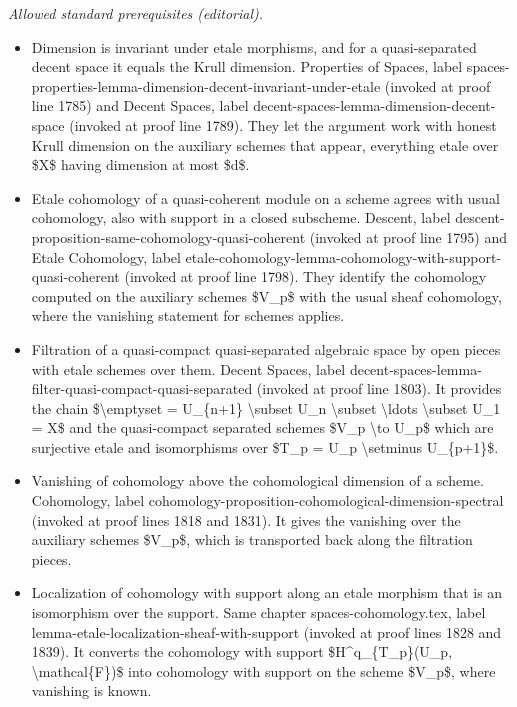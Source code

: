 \documentclass[10pt,a4paper]{amsart}
\theoremstyle{plain}
\theoremstyle{definition}
\theoremstyle{remark}
\numberwithin{equation}{subsection}
\begin{document}
\noindent\textit{Allowed standard prerequisites (editorial).}\begin{itemize}
\item Dimension is invariant under etale morphisms, and for a quasi-separated decent space it equals the Krull dimension. Properties of Spaces, label spaces-properties-lemma-dimension-decent-invariant-under-etale (invoked at proof line 1785) and Decent Spaces, label decent-spaces-lemma-dimension-decent-space (invoked at proof line 1789). They let the argument work with honest Krull dimension on the auxiliary schemes that appear, everything etale over \$X\$ having dimension at most \$d\$.
\item Etale cohomology of a quasi-coherent module on a scheme agrees with usual cohomology, also with support in a closed subscheme. Descent, label descent-proposition-same-cohomology-quasi-coherent (invoked at proof line 1795) and Etale Cohomology, label etale-cohomology-lemma-cohomology-with-support-quasi-coherent (invoked at proof line 1798). They identify the cohomology computed on the auxiliary schemes \$V\_p\$ with the usual sheaf cohomology, where the vanishing statement for schemes applies.
\item Filtration of a quasi-compact quasi-separated algebraic space by open pieces with etale schemes over them. Decent Spaces, label decent-spaces-lemma-filter-quasi-compact-quasi-separated (invoked at proof line 1803). It provides the chain \$\textbackslash{}emptyset = U\_\{n+1\} \textbackslash{}subset U\_n \textbackslash{}subset \textbackslash{}ldots \textbackslash{}subset U\_1 = X\$ and the quasi-compact separated schemes \$V\_p \textbackslash{}to U\_p\$ which are surjective etale and isomorphisms over \$T\_p = U\_p \textbackslash{}setminus U\_\{p+1\}\$.
\item Vanishing of cohomology above the cohomological dimension of a scheme. Cohomology, label cohomology-proposition-cohomological-dimension-spectral (invoked at proof lines 1818 and 1831). It gives the vanishing over the auxiliary schemes \$V\_p\$, which is transported back along the filtration pieces.
\item Localization of cohomology with support along an etale morphism that is an isomorphism over the support. Same chapter spaces-cohomology.tex, label lemma-etale-localization-sheaf-with-support (invoked at proof lines 1828 and 1839). It converts the cohomology with support \$H\textasciicircum{}q\_\{T\_p\}(U\_p, \textbackslash{}mathcal\{F\})\$ into cohomology with support on the scheme \$V\_p\$, where vanishing is known.
\end{itemize}\medskip
\end{document}
